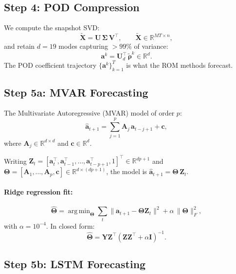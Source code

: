 \documentclass[11pt]{article}
\newcommand{\R}{\mathbb{R}}
\newcommand{\ba}{\mathbf{a}}
\newcommand{\brho}{\boldsymbol{\rho}}
\DeclareMathOperator*{\argmin}{arg\,min}
\begin{document}
\subsection{Step 4: POD Compression}

We compute the snapshot SVD:
\begin{equation}
  \tilde{\mathbf{X}} = \mathbf{U}\,\boldsymbol{\Sigma}\,\mathbf{V}^\top,
  \qquad
  \tilde{\mathbf{X}} \in \R^{MT \times n},
\end{equation}
and retain $d = 19$ modes capturing $> 99\%$ of variance:
\begin{equation}
  \ba^k = \mathbf{U}_d^\top\,\tilde{\brho}^k \in \R^d.
\end{equation}
The POD coefficient trajectory $\{\ba^k\}_{k=1}^T$ is what the ROM
methods forecast.


\subsection{Step 5a: MVAR Forecasting}
\label{sec:mvar}

The Multivariate Autoregressive (MVAR) model of order $p$:
\begin{equation}\label{eq:mvar}
  \hat{\ba}_{t+1} = \sum_{j=1}^p \mathbf{A}_j\,\ba_{t-j+1} + \mathbf{c},
\end{equation}
where $\mathbf{A}_j \in \R^{d \times d}$ and $\mathbf{c} \in \R^d$.

Writing $\mathbf{Z}_t = [\ba_t^\top, \ba_{t-1}^\top, \ldots, \ba_{t-p+1}^\top, 1]^\top \in \R^{dp+1}$
and $\boldsymbol{\Theta} = [\mathbf{A}_1, \ldots, \mathbf{A}_p, \mathbf{c}] \in \R^{d \times (dp+1)}$,
the model is $\hat{\ba}_{t+1} = \boldsymbol{\Theta}\,\mathbf{Z}_t$.

\paragraph{Ridge regression fit:}
\begin{equation}
  \hat{\boldsymbol{\Theta}} = \argmin_{\boldsymbol{\Theta}}
  \sum_t \|\ba_{t+1} - \boldsymbol{\Theta}\mathbf{Z}_t\|^2
  + \alpha\,\|\boldsymbol{\Theta}\|_F^2,
\end{equation}
with $\alpha = 10^{-4}$.  In closed form:
\begin{equation}
  \hat{\boldsymbol{\Theta}} = \mathbf{Y}\mathbf{Z}^\top(\mathbf{Z}\mathbf{Z}^\top + \alpha\mathbf{I})^{-1}.
\end{equation}


\subsection{Step 5b: LSTM Forecasting}
\label{sec:lstm}
\end{document}
